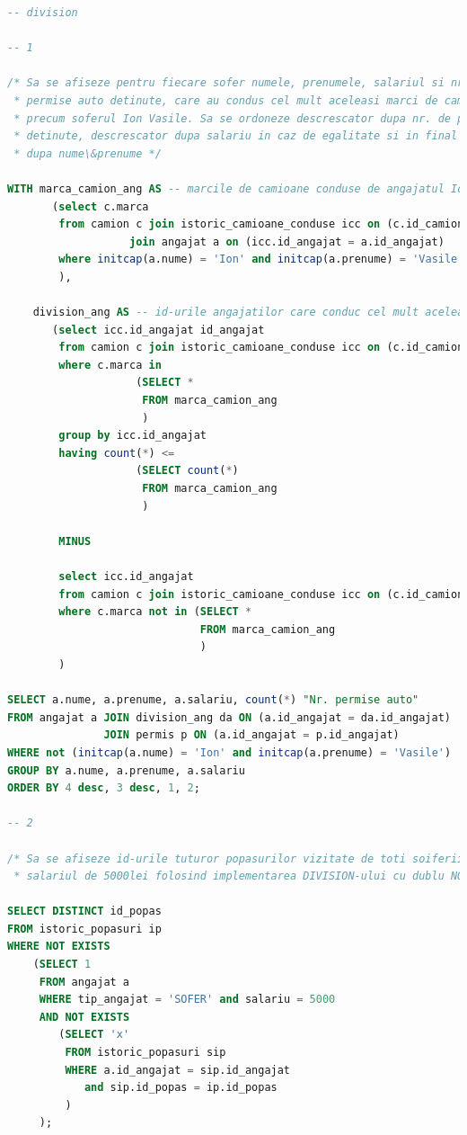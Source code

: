 \documentclass[12pt, a4paper]{article}
\begin{document}
\begin{lstlisting}[language=SQL]
-- division

-- 1

/* Sa se afiseze pentru fiecare sofer numele, prenumele, salariul si nr. de
 * permise auto detinute, care au condus cel mult aceleasi marci de camioane
 * precum soferul Ion Vasile. Sa se ordoneze descrescator dupa nr. de permise
 * detinute, descrescator dupa salariu in caz de egalitate si in final crescator
 * dupa nume\&prenume */

WITH marca_camion_ang AS -- marcile de camioane conduse de angajatul Ion Vasile
       (select c.marca
        from camion c join istoric_camioane_conduse icc on (c.id_camion = icc.id_camion)
                   join angajat a on (icc.id_angajat = a.id_angajat)
        where initcap(a.nume) = 'Ion' and initcap(a.prenume) = 'Vasile'
        ),

    division_ang AS -- id-urile angajatilor care conduc cel mult aceleasi marci de camioane precum ang Ion Vasile (inclusiv el)
       (select icc.id_angajat id_angajat
        from camion c join istoric_camioane_conduse icc on (c.id_camion = icc.id_camion)
        where c.marca in
                    (SELECT *
                     FROM marca_camion_ang
                     )
        group by icc.id_angajat
        having count(*) <=
                    (SELECT count(*)
                     FROM marca_camion_ang
                     )

        MINUS

        select icc.id_angajat
        from camion c join istoric_camioane_conduse icc on (c.id_camion = icc.id_camion)
        where c.marca not in (SELECT *
                              FROM marca_camion_ang
                              )
        )

SELECT a.nume, a.prenume, a.salariu, count(*) "Nr. permise auto"
FROM angajat a JOIN division_ang da ON (a.id_angajat = da.id_angajat)
               JOIN permis p ON (a.id_angajat = p.id_angajat)
WHERE not (initcap(a.nume) = 'Ion' and initcap(a.prenume) = 'Vasile')
GROUP BY a.nume, a.prenume, a.salariu
ORDER BY 4 desc, 3 desc, 1, 2;

-- 2

/* Sa se afiseze id-urile tuturor popasurilor vizitate de toti soiferii cu
 * salariul de 5000lei folosind implementarea DIVISION-ului cu dublu NOT EXISTS */

SELECT DISTINCT id_popas
FROM istoric_popasuri ip
WHERE NOT EXISTS
    (SELECT 1
     FROM angajat a
     WHERE tip_angajat = 'SOFER' and salariu = 5000
     AND NOT EXISTS
        (SELECT 'x'
         FROM istoric_popasuri sip
         WHERE a.id_angajat = sip.id_angajat
            and sip.id_popas = ip.id_popas
         )
     );


\end{lstlisting}
\end{document}
